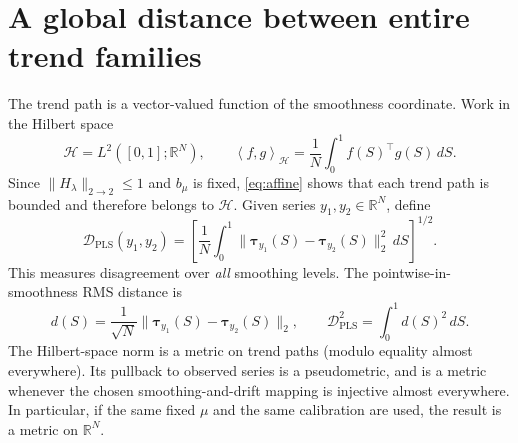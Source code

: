 \documentclass[10pt,letterpaper]{article}
\newcommand{\R}{\mathbb{R}}
\newcommand{\Hilbert}{\mathcal{H}}
\newcommand{\ip}[2]{\left\langle#1,#2\right\rangle}
\begin{document}
\section{A global distance between entire trend families}
\label{sec:global}
The trend path is a vector-valued function of the smoothness
coordinate. Work in the Hilbert space
\begin{equation}
 \Hilbert=L^2([0,1];\R^N),\qquad
 \ip{f}{g}_{\Hilbert}=\frac1N\int_0^1f(S)^\top g(S)\,dS.
\end{equation}
Since $\|H_\lambda\|_{2\to2}\le1$ and $b_\mu$ is fixed,
\eqref{eq:affine} shows that each trend path is bounded and therefore
belongs to $\Hilbert$. Given series $y_1,y_2\in\R^N$, define
\begin{equation}\label{eq:main}
\mathcal D_{\mathrm{PLS}}(y_1,y_2)
 =\left[\frac1N\int_0^1
 \|\bm\tau_{y_1}(S)-\bm\tau_{y_2}(S)\|_2^2\,dS
 \right]^{1/2}.
\end{equation}
This measures disagreement over \emph{all} smoothing levels.
The pointwise-in-smoothness RMS distance is
\begin{equation}\label{eq:pointwise}
 d(S)=\frac1{\sqrt N}\|\bm\tau_{y_1}(S)-\bm\tau_{y_2}(S)\|_2,
 \qquad \mathcal D_{\mathrm{PLS}}^2=\int_0^1d(S)^2\,dS.
\end{equation}
The Hilbert-space norm is a metric on trend paths (modulo equality
almost everywhere). Its pullback to observed series is a pseudometric,
and is a metric whenever the chosen smoothing-and-drift mapping is
injective almost everywhere. In particular, if the same fixed $\mu$
and the same calibration are used, the result is a metric on $\R^N$.
\end{document}
